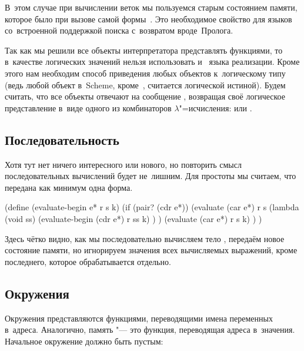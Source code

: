 В~этом случае при вычислении веток мы пользуемся старым состоянием памяти,
которое было при вызове самой формы~. Это необходимое свойство для языков
со~встроенной поддержкой поиска с~возвратом вроде~Пролога.

Так как мы решили все объекты интерпретатора представлять функциями, то
в~качестве логических значений нельзя использовать  и~ языка
реализации. Кроме этого нам необходим способ приведения любых объектов
к~логическому типу (ведь любой объект в~Scheme, кроме~, считается
логической истиной). Будем считать, что все объекты отвечают на сообщение
, возвращая своё логическое представление в~виде одного из
комбинаторов $\lambda$"=исчисления:  или
.



\subsection{Последовательность}\label{assignment/implementation/ssect:sequence}

Хотя тут нет ничего интересного или нового, но повторить смысл последовательных
вычислений будет не~лишним. Для простоты мы считаем, что  передана
как минимум одна форма.

\begin{code:lisp}
(define (evaluate-begin e* r s k)
  (if (pair? (cdr e*))
      (evaluate (car e*) r s
        (lambda (void ss)
          (evaluate-begin (cdr e*) r ss k) ) )
      (evaluate (car e*) r s k) ) )
\end{code:lisp}

Здесь чётко видно, как мы последовательно вычисляем тело , передаём
новое состояние памяти, но игнорируем значения всех вычисляемых выражений, кроме
последнего, которое обрабатывается отдельно.


\subsection{Окружения}\label{assignment/implementation/ssect:environment}

Окружения представляются функциями, переводящими имена переменных в~адреса.
Аналогично, память "--- это функция, переводящая адреса в~значения. Начальное
окружение должно быть пустым:

